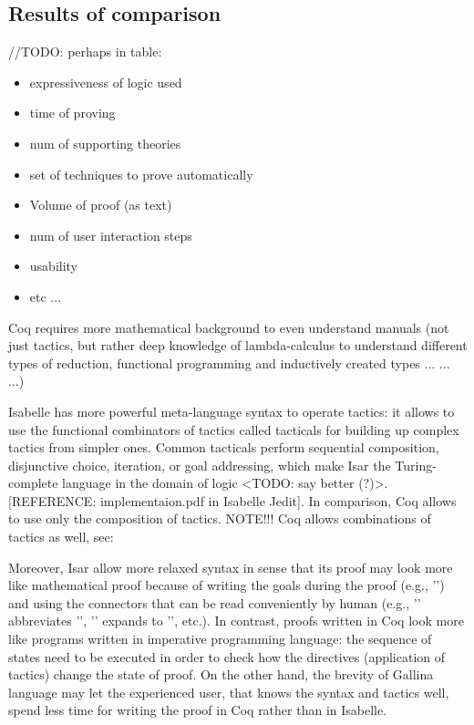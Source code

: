\documentclass[article]{aaltoseries}
\begin{document}



\subsection{Results of comparison}
\label{sec:joint_comparison}

//TODO: perhaps in table:
\begin{itemize}
	\itemsep0em
	\item expressiveness of logic used
	\item time of proving
	\item num of supporting theories
	\item set of techniques to prove automatically
	\item Volume of proof (as text)
	\item num of user interaction steps
	\item usability
	\item etc ...
\end{itemize}


Coq requires more mathematical background to even understand manuals (not just tactics, but rather deep knowledge of lambda-calculus to understand different types of reduction, functional programming and inductively created types ... ... ...)

Isabelle has more powerful meta-language syntax to operate tactics: it allows to use the functional combinators of tactics called tacticals for building up complex tactics from simpler ones. Common tacticals perform sequential composition, disjunctive choice, iteration, or goal addressing, which make Isar the Turing-complete language in the domain of logic <TODO: say better (?)>. [REFERENCE: implementaion.pdf in Isabelle Jedit]. In comparison, Coq allows to use only the composition of tactics. 
NOTE!!! Coq allows combinations of tactics as well, see: %

Moreover, Isar allow more relaxed syntax in sense that its proof may look more like mathematical proof because of writing the goals during the proof (e.g., '') and using the connectors that can be read conveniently by human (e.g., '' abbreviates '', '' expands to '', etc.). In contrast, proofs written in Coq look more like programs written in imperative programming language: the sequence of states need to be executed in order to check how the directives (application of tactics) change the state of proof. On the other hand, the brevity of Gallina language may let the experienced user, that knows the syntax and tactics well, spend less time for writing the proof in Coq rather than in Isabelle.
\end{document}
